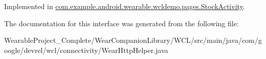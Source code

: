 Implemented in \hyperlink{classcom_1_1example_1_1android_1_1wearable_1_1wcldemo_1_1pages_1_1StockActivity_a175b9ab0505f9c4dfb8b1f4928e96271}{com.\+example.\+android.\+wearable.\+wcldemo.\+pages.\+Stock\+Activity}.



The documentation for this interface was generated from the following file\+:\begin{DoxyCompactItemize}
\item 
Wearable\+Project\+\_\+\+Complete/\+Wear\+Companion\+Library/\+W\+C\+L/src/main/java/com/google/devrel/wcl/connectivity/Wear\+Http\+Helper.\+java\end{DoxyCompactItemize}
